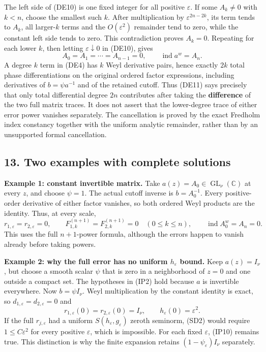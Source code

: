 \documentclass[
  11pt,
]{article}
\begin{document}
The left side of (DE10) is one fixed integer for all positive
\(\varepsilon\). If some \(A_k\ne0\) with \(k<n\), choose the smallest
such \(k\). After multiplication by \(\varepsilon^{2n-2k}\), its term
tends to \(A_k\), all larger-\(k\) terms and the \(O(\varepsilon^2)\)
remainder tend to zero, while the constant left side tends to zero. This
contradiction proves \(A_k=0\). Repeating for each lower \(k\), then
letting \(\varepsilon\downarrow0\) in (DE10), gives \[
 A_0=A_1=\cdots=A_{n-1}=0,\qquad
 \operatorname{ind}a^w=A_n .
 \tag{DE11}
\] A degree \(k\) term in (DE4) has \(k\) Weyl derivative pairs, hence
exactly \(2k\) total phase differentiations on the original ordered
factor expressions, including derivatives of \(b=\psi a^{-1}\) and of
the retained cutoff. Thus (DE11) says precisely that only total
differential degree \(2n\) contributes after taking the
\textbf{difference} of the two full matrix traces. It does not assert
that the lower-degree trace of either error power vanishes separately.
The cancellation is proved by the exact Fredholm index constancy
together with the uniform analytic remainder, rather than by an
unsupported formal cancellation.

\subsection{13. Two examples with complete
solutions}\label{two-examples-with-complete-solutions}

\textbf{Example 1: constant invertible matrix.} Take
\(a(z)=A_0\in\operatorname{GL}_{\nu}(\mathbb C)\) at every \(z\), and
choose \(\psi=1\). The actual cutoff inverse is \(b=A_0^{-1}\). Every
positive-order derivative of either factor vanishes, so both ordered
Weyl products are the identity. Thus, at every scale, \[
 r_{1,\varepsilon}=r_{2,\varepsilon}=0,\qquad
 F_{1,k}^{(n+1)}=F_{2,k}^{(n+1)}=0
 \quad(0\le k\le n),\qquad
 \operatorname{ind}A_0^w=A_n=0 .
 \tag{SD1}
\] This uses the full \(n+1\)-power formula, although the errors happen
to vanish already before taking powers.

\textbf{Example 2: why the full error has no uniform \(h_\varepsilon\)
bound.} Keep \(a(z)=I_\nu\), but choose a smooth scalar \(\psi\) that is
zero in a neighborhood of \(z=0\) and one outside a compact set. The
hypotheses in (IP2) hold because \(a\) is invertible everywhere. Now
\(b=\psi I_\nu\). Weyl multiplication by the constant identity is exact,
so \(d_{1,\varepsilon}=d_{2,\varepsilon}=0\) and \[
 r_{1,\varepsilon}(0)=r_{2,\varepsilon}(0)=I_\nu,
 \qquad h_\varepsilon(0)=\varepsilon^2 .
 \tag{SD2}
\] If the full \(r_{j,\varepsilon}\) had a uniform
\(S(h_\varepsilon,g_\varepsilon)\) zeroth seminorm, (SD2) would require
\(1\le C\varepsilon^2\) for every positive \(\varepsilon\), which is
impossible. For each fixed \(\varepsilon\), (IP10) remains true. This
distinction is why the finite expansion retains
\((1-\psi_\varepsilon)I_\nu\) separately.
\end{document}
